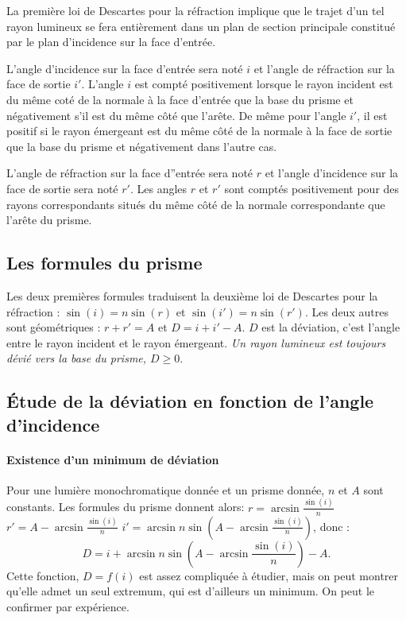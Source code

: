 La première loi de Descartes pour la réfraction implique que le trajet d'un tel rayon lumineux se fera entièrement dans un plan de section principale constitué par le plan d'incidence sur la face d'entrée.

L'angle d'incidence sur la face d'entrée sera noté $i$ et l'angle de réfraction sur la face de sortie $i'$. L'angle $i$ est compté positivement lorsque le rayon incident est du même coté de la normale à la face d'entrée que la base du prisme et négativement s'il est du même côté que l'arête. De même pour l'angle $i'$, il est positif si le rayon émergeant est du même côté de la normale à la face de sortie que la base du prisme et négativement dans l'autre cas.

L'angle de réfraction sur la face d''entrée sera noté $r$ et l'angle d'incidence sur la face de sortie sera noté $r'$. Les angles $r$ et $r'$ sont comptés positivement pour des rayons correspondants situés du même côté de la normale correspondante que l'arête du prisme.

\subsection{Les formules du prisme}
\label{chap6-subsec:formulesprisme}

Les deux premières formules traduisent la deuxième loi de Descartes pour la réfraction : $\sin(i) = n\sin(r)$ et $\sin(i') = n\sin(r')$. Les deux autres sont géométriques : $r+r'=A$ et $D=i+i'-A$. $D$ est la déviation, c'est l'angle entre le rayon incident et le rayon émergeant. \emph{Un rayon lumineux est toujours dévié vers la base du prisme, $D \geq 0$}.

\subsection{Étude de la déviation en fonction de l'angle d'incidence}
\label{chap6-subsec:etudedeviation}
\paragraph{Existence d'un minimum de déviation}

Pour une lumière monochromatique donnée et un prisme donnée, $n$ et $A$ sont constants. Les formules du prisme donnent alors:
$r = \arcsin{\frac{\sin(i)}{n}}$ $r'=A - \arcsin{\frac{\sin(i)}{n}}$ $i' = \arcsin{n\sin\left(A-\arcsin{\frac{\sin(i)}{n}}\right)}$, donc :
\begin{equation}
  D = i + \arcsin{n\sin\left(A-\arcsin{\frac{\sin(i)}{n}}\right)} -A.
\end{equation}
Cette fonction, $D=f(i)$ est assez compliquée à étudier, mais on peut montrer qu'elle admet un seul extremum, qui est d'ailleurs un minimum. On peut le confirmer par expérience.

